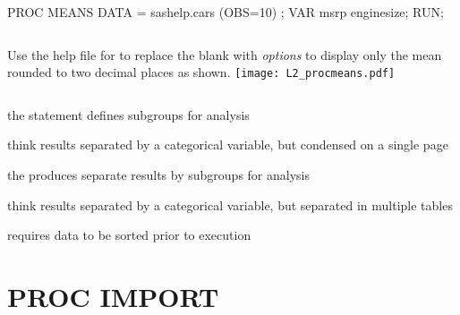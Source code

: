 \begin{frame}[fragile]
\footnotesize
\begin{code}{.0}
PROC MEANS DATA = sashelp.cars (OBS=10) \textcolor{OrangeRed}{\underline{\hspace{0.5in}}};
	VAR msrp enginesize;
RUN;
\end{code}
\emp
\vskip20pt
\begin{columns}
\oyo Use the help file for  to replace the blank with \emph{options} to display only the mean rounded to two decimal places as shown.
\texttt{[image: L2\_procmeans.pdf]}
\end{columns}
\end{frame}

\begin{frame}
\bi
    \item the  statement defines subgroups for analysis 
    \bi
        \item think results separated by a categorical variable, but condensed on a single page
    \ei 
    \item[]
    \item the  produces separate results by subgroups for analysis
    \bi 
        \item think results separated by a categorical variable, but separated in multiple tables
        \item requires data to be sorted prior to execution
    \ei 
\ei 
\end{frame}

\section[PROC IMPORT]{PROC IMPORT}
\subsection{}
\begin{frame}
\end{frame}

